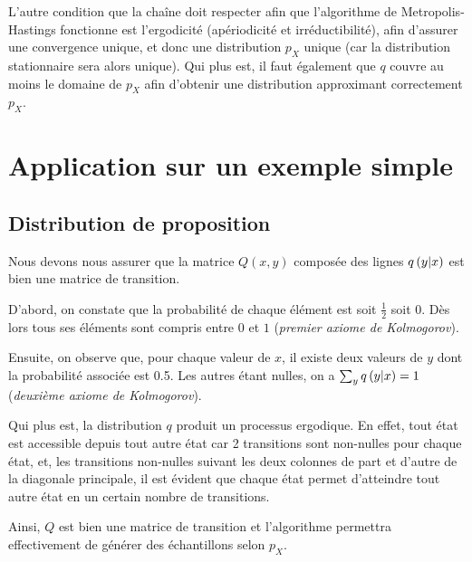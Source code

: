 \documentclass[a4paper, 12pt]{report}
\begin{document}
	L'autre condition que la chaîne doit respecter afin que l'algorithme de Metropolis-Hastings fonctionne est l'ergodicité (apériodicité et irréductibilité), afin d'assurer une convergence unique, et donc une distribution $p_X$ unique (car la distribution stationnaire sera alors unique). Qui plus est, il faut également que $q$ couvre au moins le domaine de $p_X$ afin d'obtenir une distribution approximant correctement $p_X$. 
	\section{Application sur un exemple simple}
	\subsection{Distribution de proposition}
	Nous devons nous assurer que la matrice $Q(x, y)$ composée des lignes $q\left(y|x\right)$ est bien une matrice de transition. \par
	D'abord, on constate que la probabilité de chaque élément est soit $\frac{1}{2}$ soit $0$. Dès lors tous ses éléments sont compris entre $0$ et $1$ (\emph{premier axiome de Kolmogorov}). \par
	Ensuite, on observe que, pour chaque valeur de $x$, il existe deux valeurs de $y$ dont la probabilité associée est \num{0.5}. Les autres étant nulles, on a $\sum_y q\left(y|x\right) = 1$ (\emph{deuxième axiome de Kolmogorov}). \par
	
	Qui plus est, la distribution $q$ produit un processus ergodique. En effet,  tout état est accessible depuis tout autre état car 2 transitions sont non-nulles pour chaque état, et, les transitions non-nulles suivant les deux colonnes de part et d'autre de la diagonale principale, il est évident que chaque état permet d'atteindre tout autre état en un certain nombre de transitions. \cite{ergodicity} 
	\par
	Ainsi, $Q$ est bien une matrice de transition et l'algorithme permettra effectivement de générer des échantillons selon $p_X$.
\end{document}
